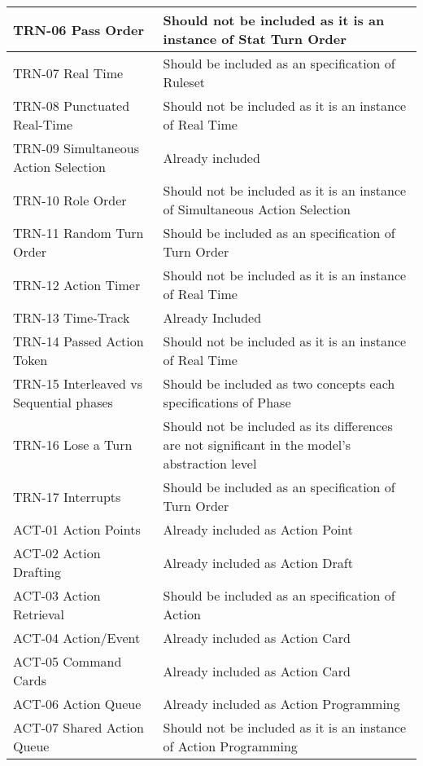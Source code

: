 \begin{longtable}{|m{7cm}|m{7cm}|}
        \hline
        TRN-06 Pass Order & Should not be included as it is an instance of Stat Turn Order \\
        \hline
        TRN-07 Real Time & Should be included as an specification of Ruleset \\
        \hline
        TRN-08 Punctuated Real-Time & Should not be included as it is an instance of Real Time \\
        \hline
        TRN-09 Simultaneous Action Selection & Already included \\
        \hline
        TRN-10 Role Order & Should not be included as it is an instance of Simultaneous Action Selection \\
        \hline
        TRN-11 Random Turn Order & Should be included as an specification of Turn Order \\
        \hline
        TRN-12 Action Timer & Should not be included as it is an instance of Real Time \\
        \hline
        TRN-13 Time-Track & Already Included \\
        \hline
        TRN-14 Passed Action Token & Should not be included as it is an instance of Real Time \\
        \hline
        TRN-15 Interleaved vs Sequential phases & Should be included as two concepts each specifications of Phase \\
        \hline
        TRN-16 Lose a Turn & Should not be included as its differences are not significant in the model's abstraction level \\
        \hline
        TRN-17 Interrupts & Should be included as an specification of Turn Order \\
        \hline
        ACT-01 Action Points  & Already included as Action Point \\
        \hline
        ACT-02 Action Drafting & Already included as Action Draft \\
        \hline
        ACT-03 Action Retrieval & Should be included as an specification of Action \\
        \hline
        ACT-04 Action/Event & Already included as Action Card \\
        \hline
        ACT-05 Command Cards & Already included as Action Card \\
        \hline
        ACT-06 Action Queue & Already included as Action Programming \\
        \hline
        ACT-07 Shared Action Queue & Should not be included as it is an instance of Action Programming \\

\end{longtable}
